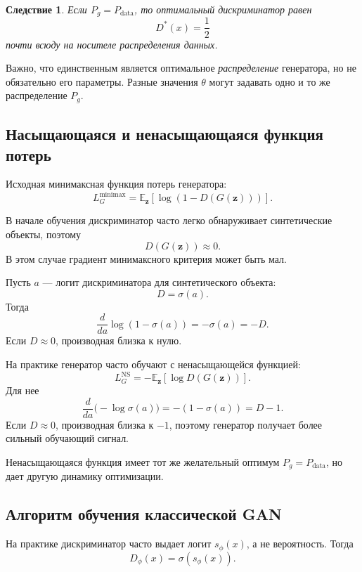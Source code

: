 \documentclass[12pt,a4paper]{article}
\newcommand{\E}{\mathbb{E}}
\numberwithin{equation}{section}
\newtheorem{corollary}[theorem]{Следствие}
\theoremstyle{definition}
\theoremstyle{remark}
\begin{document}
\begin{corollary}
Если \(P_g=P_{\mathrm{data}}\), то оптимальный дискриминатор равен
\[
    D^*(x)=\frac{1}{2}
\]
почти всюду на носителе распределения данных.
\end{corollary}

Важно, что единственным является оптимальное \emph{распределение}
генератора, но не обязательно его параметры. Разные значения
\(\theta\) могут задавать одно и то же распределение \(P_g\).

\subsection{Насыщающаяся и ненасыщающаяся функция потерь}

Исходная минимаксная функция потерь генератора:
\[
    L_G^{\mathrm{minimax}}
    =
    \E_{\bm{z}}
    \left[
        \log(1-D(G(\bm{z})))
    \right].
\]

В начале обучения дискриминатор часто легко обнаруживает синтетические
объекты, поэтому
\[
    D(G(\bm{z}))\approx0.
\]
В этом случае градиент минимаксного критерия может быть мал.

Пусть \(a\) --- логит дискриминатора для синтетического объекта:
\[
    D=\sigma(a).
\]
Тогда
\[
    \frac{d}{da}\log(1-\sigma(a))
    =
    -\sigma(a)
    =
    -D.
\]
Если \(D\approx0\), производная близка к нулю.

На практике генератор часто обучают с ненасыщающейся функцией:
\[
    L_G^{\mathrm{NS}}
    =
    -\E_{\bm{z}}
    [\log D(G(\bm{z}))].
\]
Для нее
\[
    \frac{d}{da}\bigl(-\log\sigma(a)\bigr)
    =
    -(1-\sigma(a))
    =
    D-1.
\]
Если \(D\approx0\), производная близка к \(-1\), поэтому генератор
получает более сильный обучающий сигнал.

Ненасыщающаяся функция имеет тот же желательный оптимум
\(P_g=P_{\mathrm{data}}\), но дает другую динамику оптимизации.

\subsection{Алгоритм обучения классической GAN}

На практике дискриминатор часто выдает логит \(s_\phi(x)\), а не
вероятность. Тогда
\[
    D_\phi(x)=\sigma(s_\phi(x)).
\]
\end{document}
